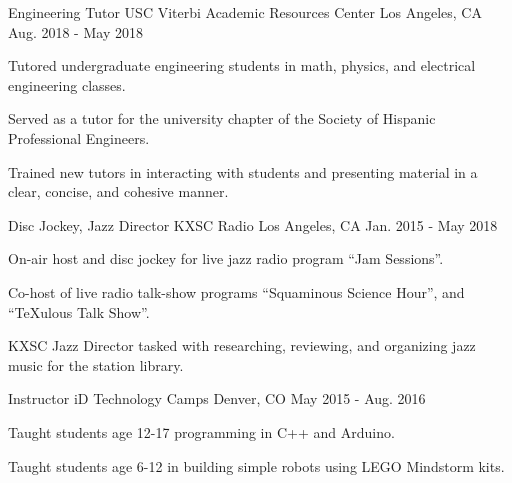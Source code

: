 \begin{cventries}
    \cventry
    {Engineering Tutor} %
    {USC Viterbi Academic Resources Center} %
    {Los Angeles, CA} %
    {Aug. 2018 - May 2018} %
    {
      \begin{cvitems} %
        \item {Tutored undergraduate engineering students in math, physics, and electrical engineering classes.}
        \item {Served as a tutor for the university chapter of the Society of Hispanic Professional Engineers.}
        \item {Trained new tutors in interacting with students and presenting material in a clear, concise, and cohesive manner.}
      \end{cvitems}
    }

  \cventry
    {Disc Jockey, Jazz Director} %
    {KXSC Radio} %
    {Los Angeles, CA} %
    {Jan. 2015 - May 2018} %
    {
      \begin{cvitems} %
        \item {On-air host and disc jockey for live jazz radio program ``Jam Sessions''.}
        \item {Co-host of live radio talk-show programs ``Squaminous Science Hour'', and ``TeXulous Talk Show''.}
        \item {KXSC Jazz Director tasked with researching, reviewing, and organizing jazz music for the station library.}
      \end{cvitems}
    }
    \cventry
    {Instructor} %
    {iD Technology Camps} %
    {Denver, CO} %
    {May 2015 - Aug. 2016} %
    {
      \begin{cvitems} %
        \item {Taught students age 12-17 programming in C++ and Arduino.}
        \item {Taught students age 6-12 in building simple robots using LEGO Mindstorm kits.}
      \end{cvitems}
    }

\end{cventries}
